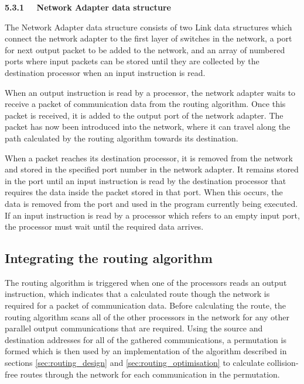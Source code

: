 \documentclass[a4paper, 12pt]{article}
\begin{document}
\noindent\textbf{5.3.1 \ \ Network Adapter data structure}

\noindent The Network Adapter data structure consists of two Link data structures which connect the network adapter to the first layer of switches in the network, a port for next output packet to be added to the network, and an array of numbered ports where input packets can be stored until they are collected by the destination processor when an input instruction is read.

When an output instruction is read by a processor, the network adapter waits to receive a packet of communication data from the routing algorithm. Once this packet is received, it is added to the output port of the network adapter. The packet has now been introduced into the network, where it can travel along the path calculated by the routing algorithm towards its destination.

When a packet reaches its destination processor, it is removed from the network and stored in the specified port number in the network adapter. It remains stored in the port until an input instruction is read by the destination processor that requires the data inside the packet stored in that port. When this occurs, the data is removed from the port and used in the program currently being executed. If an input instruction is read by a processor which refers to an empty input port, the processor must wait until the required data arrives.

\subsection{Integrating the routing algorithm}

The routing algorithm is triggered when one of the processors reads an output instruction, which indicates that a calculated route though the network is required for a packet of communication data. Before calculating the route, the routing algorithm scans all of the other processors in the network for any other parallel output communications that are required. Using the source and destination addresses for all of the gathered communications, a permutation is formed which is then used by an implementation of the algorithm described in sections \ref{sec:routing_design} and \ref{sec:routing_optimisation} to calculate collision-free routes through the network for each communication in the permutation. 
\end{document}
